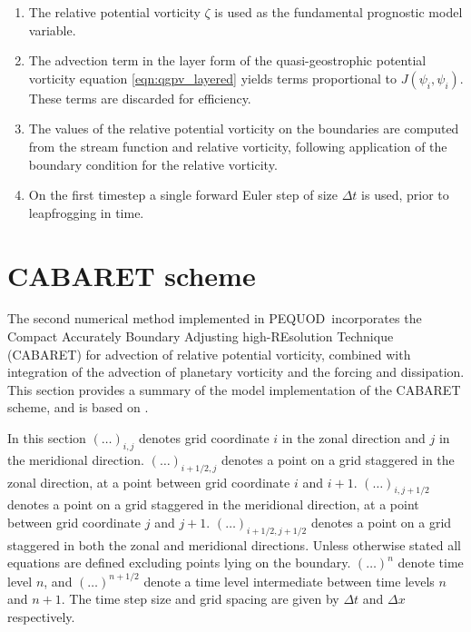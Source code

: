 \documentclass[a4paper]{book}
\newcommand{\pequod}{PEQUOD}
\begin{document}
\begin{enumerate}
  \item The relative potential vorticity $\zeta$ is used as the fundamental
        prognostic model variable.
  \item The advection term in the layer form of the quasi-geostrophic potential
        vorticity equation \eqref{eqn:qgpv_layered} yields terms proportional to
        $J \left( \psi_i, \psi_i \right)$. These terms are discarded for efficiency.
  \item The values of the relative potential vorticity on the boundaries are
        computed from the stream function and relative vorticity, following
        application of the boundary condition for the relative vorticity.
  \item On the first timestep a single forward Euler step of size $\Delta t$
        is used, prior to leapfrogging in time.
\end{enumerate}

\section{CABARET scheme}\label{sect:cabaret}

The second numerical method implemented in \pequod\ incorporates the
Compact Accurately Boundary Adjusting high-REsolution Technique (CABARET)
for advection of relative potential vorticity, combined with integration
of the advection of planetary vorticity and the forcing and dissipation. This
section provides a summary of the model implementation of the CABARET scheme,
and is based on \citet{karabasov2009}.

In this section $\left( \ldots \right)_{i,j}$ denotes grid coordinate $i$ in the
zonal direction and $j$ in the meridional direction.
$\left( \ldots \right)_{i + 1 / 2,j}$ denotes a point on a grid staggered in the
zonal direction, at a point between grid coordinate $i$ and $i + 1$.
$\left( \ldots \right)_{i,j + 1 / 2}$ denotes a point on a grid staggered in the
meridional direction, at a point between grid coordinate $j$ and $j + 1$.
$\left( \ldots \right)_{i + 1 / 2,j + 1 / 2}$ denotes a point on a grid
staggered in both the zonal and meridional directions.
Unless otherwise stated all equations are defined excluding points lying on the
boundary.
$\left( \ldots \right)^n$ denote time level $n$, and
$\left( \ldots \right)^{n + 1 / 2}$ denote a time level intermediate between
time levels $n$ and $n + 1$. The time step size and
grid spacing are given by $\Delta t$ and $\Delta x$ respectively.
\end{document}

